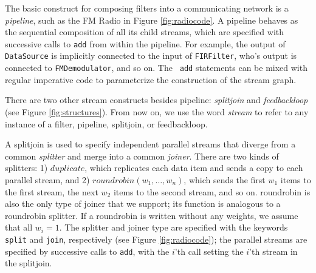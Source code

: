 


The basic construct for composing filters into a communicating network
is a {\it pipeline}, such as the FM Radio in Figure
\ref{fig:radiocode}.  A pipeline behaves as the sequential composition
of all its child streams, which are specified with successive calls to
{\tt add} from within the pipeline.  For example, the output of {\tt
DataSource} is implicitly connected to the input of {\tt FIRFilter},
who's output is connected to {\tt FMDemodulator}, and so on.  The {\tt
add} statements can be mixed with regular imperative code to
parameterize the construction of the stream graph.

There are two other stream constructs besides pipeline: {\it
splitjoin} and {\it feedbackloop} (see Figure \ref{fig:structures}).
From now on, we use the word {\it stream} to refer to any instance of
a filter, pipeline, splitjoin, or feedbackloop.

A splitjoin is used to specify independent parallel streams that
diverge from a common {\it splitter} and merge into a common {\it
joiner}.  There are two kinds of splitters: 1) $duplicate$, which
replicates each data item and sends a copy to each parallel stream,
and 2) $roundrobin(w_1, \dots, w_n)$, which sends the first $w_1$
items to the first stream, the next $w_2$ items to the second stream,
and so on.  roundrobin is also the only type of joiner that we
support; its function is analogous to a roundrobin splitter.  If a
roundrobin is written without any weights, we assume that all $w_i =
1$.  The splitter and joiner type are specified with the keywords {\tt
split} and {\tt join}, respectively (see Figure \ref{fig:radiocode});
the parallel streams are specified by successive calls to {\tt add},
with the $i$'th call setting the $i$'th stream in the splitjoin.

